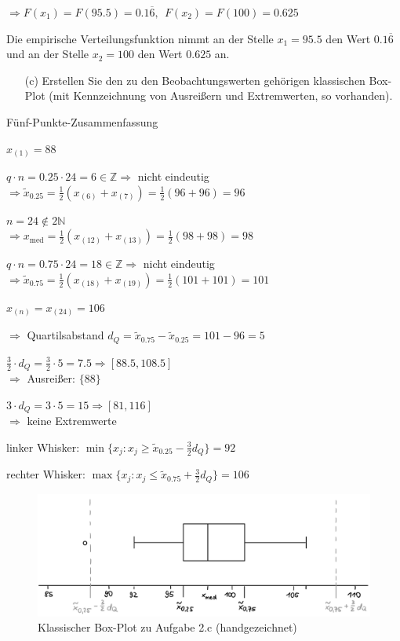 $\Rightarrow F(x_1) = F(95.5) = 0.1\overline{6},~~F(x_2) = F(100) = 0.625$

Die empirische Verteilungsfunktion nimmt an der Stelle $x_1=95.5$ den Wert $0.1\overline{6}$ und an der Stelle $x_2=100$ den Wert $0.625$ an.


\begin{task}
    \begin{enumerate}
        \item[(c)] Erstellen Sie den zu den Beobachtungswerten gehörigen klassischen Box-Plot (mit Kennzeichnung von Ausreißern und Extremwerten, so vorhanden).
    \end{enumerate}
\end{task}

Fünf-Punkte-Zusammenfassung

$x_{(1)} = 88$

$q\cdot n = 0.25\cdot 24 = 6\in\mathbb{Z} \Rightarrow$ nicht eindeutig \\
$\Rightarrow \tilde{x}_{0.25} = \frac12(x_{(6)} + x_{(7)}) = \frac12(96+96) = 96$

$n = 24 \notin 2\mathbb{N}$ \\
$\Rightarrow x_{\operatorname{med}} = \frac12(x_{(12)} + x_{(13)}) = \frac12(98+98) = 98$

$q\cdot n = 0.75\cdot 24 = 18\in\mathbb{Z} \Rightarrow$ nicht eindeutig \\
$\Rightarrow \tilde{x}_{0.75} = \frac12(x_{(18)} + x_{(19)}) = \frac12(101+101) = 101$

$x_{(n)} = x_{(24)} = 106$

\vspace{0.5cm}

$\Rightarrow$ Quartilsabstand $d_Q = \tilde{x}_{0.75} - \tilde{x}_{0.25} = 101 - 96 = 5$

$\frac32 \cdot d_Q = \frac32\cdot5 = 7.5 \Rightarrow [88.5, 108.5]$ \\
$\Rightarrow$ Ausreißer: $\lbrace 88 \rbrace$

$3\cdot d_Q = 3\cdot5 = 15 \Rightarrow [81, 116]$ \\
$\Rightarrow$ keine Extremwerte

\vspace{0.5cm}

linker Whisker: $\min\lbrace x_j : x_j \ge \tilde{x}_{0.25} - \frac32 d_Q \rbrace = 92$

rechter Whisker: $\max\lbrace x_j : x_j \le \tilde{x}_{0.75} + \frac32 d_Q \rbrace = 106$

\begin{figure}[H]
    \centering
    \includegraphics[width=\textwidth]{assets/task2_box_plot.jpeg}
    \caption{Klassischer Box-Plot zu Aufgabe 2.c (handgezeichnet)}
\end{figure}

